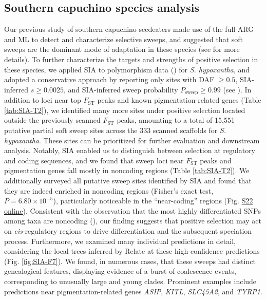 \subsection{Southern capuchino species analysis}
Our previous study of southern capuchino seedeaters made use of the full \ac{ARG} and \ac{ML} to detect and characterize selective sweeps, and suggested that soft sweeps are the dominant mode of adaptation in these species (see  for more details). To further characterize the targets and strengths of positive selection in these species, we applied \ac{SIA} to polymorphism data (\cite{turbek_rapid_2021}) for \textit{S. hypoxantha}, and adopted a conservative approach by reporting only sites with \ac{DAF} $\geq 0.5$, \ac{SIA}-inferred $s \geq 0.0025$, and \ac{SIA}-inferred sweep probability $P_{\mathrm{sweep}} \geq 0.99$ (see ). In addition to loci near top $F_{\mathrm{ST}}$ peaks and known pigmentation-related genes (Table \ref{tab:SIA-T2}), we identified many more sites under positive selection located outside the previously scanned $F_{\mathrm{ST}}$ peaks, amounting to a total of 15,551 putative partial soft sweep sites across the 333 scanned scaffolds for \textit{S. hypoxantha}. These sites can be prioritized for further evaluation and downstream analysis. Notably, \ac{SIA} enabled us to distinguish between selection at regulatory and coding sequences, and we found that sweep loci near $F_{\mathrm{ST}}$ peaks and pigmentation genes fall mostly in noncoding regions (Table \ref{tab:SIA-T2}). We additionally surveyed all putative sweep sites identified by \ac{SIA} and found that they are indeed enriched in noncoding regions (Fisher’s exact test, $P = 6.80 \times 10^{-5}$), particularly noticeable in the “near-coding” regions (Fig. \href{https://academic.oup.com/mbe/article/39/1/msab332/6433161?login=true#supplementary-data}{S22 online}). Consistent with the observation that the most highly differentiated \acsp{SNP} among taxa are noncoding (\cite{campagna_repeated_2017,turbek_rapid_2021}), our finding suggests that positive selection may act on \textit{cis}-regulatory regions to drive differentiation and the subsequent speciation process. Furthermore, we examined many individual predictions in detail, considering the local trees inferred by Relate at these high-confidence predictions (Fig. \ref{fig:SIA-F7}). We found, in numerous cases, that these sweeps had distinct genealogical features, displaying evidence of a burst of coalescence events, corresponding to unusually large and young clades. Prominent examples include predictions near pigmentation-related genes \textit{ASIP}, \textit{KITL}, \textit{SLC45A2}, and \textit{TYRP1}.

